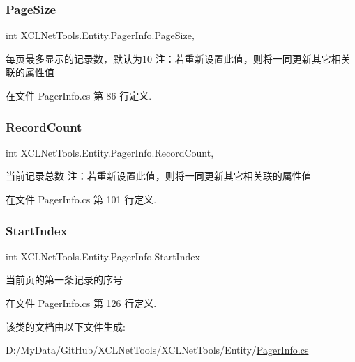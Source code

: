 \subsubsection{\texorpdfstring{Page\+Size}{PageSize}}
{\footnotesize\ttfamily int X\+C\+L\+Net\+Tools.\+Entity.\+Pager\+Info.\+Page\+Size\hspace{0.3cm}{\ttfamily [get]}, {\ttfamily [set]}}



每页最多显示的记录数，默认为10 注：若重新设置此值，则将一同更新其它相关联的属性值 



在文件 Pager\+Info.\+cs 第 86 行定义.

\mbox{\label{class_x_c_l_net_tools_1_1_entity_1_1_pager_info_a5617d4aaafa80fa664f13cfe7fbc1a6c}} 
\subsubsection{\texorpdfstring{Record\+Count}{RecordCount}}
{\footnotesize\ttfamily int X\+C\+L\+Net\+Tools.\+Entity.\+Pager\+Info.\+Record\+Count\hspace{0.3cm}{\ttfamily [get]}, {\ttfamily [set]}}



当前记录总数 注：若重新设置此值，则将一同更新其它相关联的属性值 



在文件 Pager\+Info.\+cs 第 101 行定义.

\mbox{\label{class_x_c_l_net_tools_1_1_entity_1_1_pager_info_a659b36bf635a3fed41ee3b82ec4c2cbe}} 
\subsubsection{\texorpdfstring{Start\+Index}{StartIndex}}
{\footnotesize\ttfamily int X\+C\+L\+Net\+Tools.\+Entity.\+Pager\+Info.\+Start\+Index\hspace{0.3cm}{\ttfamily [get]}}



当前页的第一条记录的序号 



在文件 Pager\+Info.\+cs 第 126 行定义.



该类的文档由以下文件生成\+:\begin{DoxyCompactItemize}
\item 
D\+:/\+My\+Data/\+Git\+Hub/\+X\+C\+L\+Net\+Tools/\+X\+C\+L\+Net\+Tools/\+Entity/\hyperlink{_pager_info_8cs}{Pager\+Info.\+cs}\end{DoxyCompactItemize}
